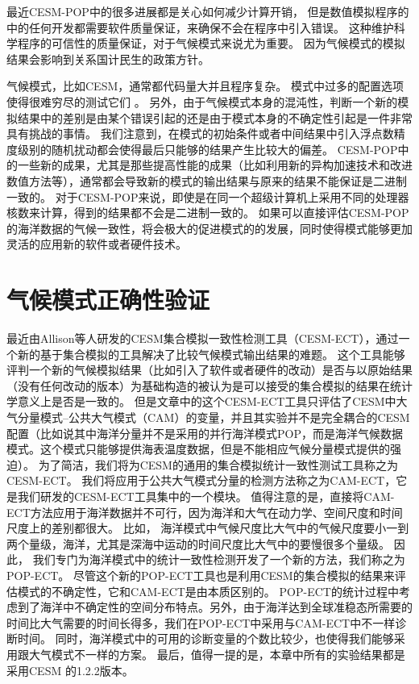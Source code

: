 最近CESM-POP中的很多进展都是关心如何减少计算开销\cite{yong2015}， 但是数值模拟程序的中的任何开发都需要软件质量保证，来确保不会在程序中引入错误。 
这种维护科学程序的可信性的质量保证，对于气候模式来说尤为重要。 
因为气候模式的模拟结果会影响到关系国计民生的政策方针\cite{carson2002, easterbrook2011}。 

  
气候模式，比如CESM，通常都代码量大并且程序复杂。 模式中过多的配置选项使得很难穷尽的测试它们 \cite{clune2011, pipitone2012}。 
另外，由于气候模式本身的混沌性，判断一个新的模拟结果中的差别是由某个错误引起的还是由于模式本身的不确定性引起是一件非常具有挑战的事情。 
我们注意到，在模式的初始条件或者中间结果中引入浮点数精度级别的随机扰动都会使得最后只能够的结果产生比较大的偏差。
CESM-POP中的一些新的成果，尤其是那些提高性能的成果（比如利用新的异构加速技术和改进数值方法等），通常都会导致新的模式的输出结果与原来的结果不能保证是二进制一致的。 
对于CESM-POP来说，即使是在同一个超级计算机上采用不同的处理器核数来计算，得到的结果都不会是二进制一致的。 
如果可以直接评估CESM-POP的海洋数据的气候一致性，将会极大的促进模式的的发展，同时使得模式能够更加灵活的应用新的软件或者硬件技术。 


\section{气候模式正确性验证}
\label{verify:ocean}

最近由Allison等人\cite{baker2015}研发的CESM集合模拟一致性检测工具（CESM-ECT），通过一个新的基于集合模拟的工具解决了比较气候模式输出结果的难题。 
这个工具能够评判一个新的气候模拟结果（比如引入了软件或者硬件的改动）是否与以原始结果（没有任何改动的版本）为基础构造的被认为是可以接受的集合模拟的结果在统计学意义上是否是一致的。 
但是文章\cite{baker2015}中的这个CESM-ECT工具只评估了CESM中大气分量模式--公共大气模式（CAM）的变量，并且其实验并不是完全耦合的CESM配置（比如说其中海洋分量并不是采用的并行海洋模式POP，而是海洋气候数据模式。这个模式只能够提供海表温度数据，但是不能相应气候分量模式提供的强迫）。 
为了简洁，我们将为CESM的通用的集合模拟统计一致性测试工具称之为CESM-ECT。 
我们将应用于公共大气模式分量的检测方法称之为CAM-ECT，它是我们研发的CESM-ECT工具集中的一个模块。 
值得注意的是，直接将CAM-ECT方法应用于海洋数据并不可行，因为海洋和大气在动力学、空间尺度和时间尺度上的差别都很大。
比如， 海洋模式中气候尺度比大气中的气候尺度要小一到两个量级，海洋，尤其是深海中运动的时间尺度比大气中的要慢很多个量级。
因此， 我们专门为海洋模式中的统计一致性检测开发了一个新的方法，我们称之为POP-ECT。 
尽管这个新的POP-ECT工具也是利用CESM的集合模拟的结果来评估模式的不确定性，它和CAM-ECT是由本质区别的。 
POP-ECT的统计过程中考虑到了海洋中不确定性的空间分布特点。另外，由于海洋达到全球准稳态所需要的时间比大气需要的时间长得多，我们在POP-ECT中采用与CAM-ECT中不一样诊断时间。 
同时，海洋模式中的可用的诊断变量的个数比较少，也使得我们能够采用跟大气模式不一样的方案。 
最后，值得一提的是，本章中所有的实验结果都是采用CESM 的1.2.2版本。


